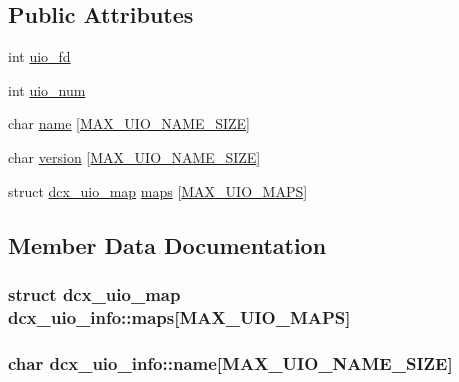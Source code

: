 \subsection*{Public Attributes}
\begin{DoxyCompactItemize}
\item 
int \hyperlink{structdcx__uio__info_a2ebe1bdd70d7c34232ea3f85c1d591d3}{uio\+\_\+fd}
\item 
int \hyperlink{structdcx__uio__info_a02e1b0caf53d192f1d50de34f63d55a0}{uio\+\_\+num}
\item 
char \hyperlink{structdcx__uio__info_ab4b1a749035222b5f3ef16038284595f}{name} \mbox{[}\hyperlink{uio_8h_a5ed3f1c67d5551770a91ef53fe208c83}{M\+A\+X\+\_\+\+U\+I\+O\+\_\+\+N\+A\+M\+E\+\_\+\+S\+I\+ZE}\mbox{]}
\item 
char \hyperlink{structdcx__uio__info_ae1be148e26467d078ca0383c16f76a41}{version} \mbox{[}\hyperlink{uio_8h_a5ed3f1c67d5551770a91ef53fe208c83}{M\+A\+X\+\_\+\+U\+I\+O\+\_\+\+N\+A\+M\+E\+\_\+\+S\+I\+ZE}\mbox{]}
\item 
struct \hyperlink{structdcx__uio__map}{dcx\+\_\+uio\+\_\+map} \hyperlink{structdcx__uio__info_ae6e32e304b1afe3b2dfeeb1a54321919}{maps} \mbox{[}\hyperlink{uio_8h_a05a77cb47b9d8cdaaee64df37627ffdc}{M\+A\+X\+\_\+\+U\+I\+O\+\_\+\+M\+A\+PS}\mbox{]}
\end{DoxyCompactItemize}


\subsection{Member Data Documentation}
\subsubsection[{\texorpdfstring{maps}{maps}}]{\setlength{\rightskip}{0pt plus 5cm}struct {\bf dcx\+\_\+uio\+\_\+map} dcx\+\_\+uio\+\_\+info\+::maps\mbox{[}{\bf M\+A\+X\+\_\+\+U\+I\+O\+\_\+\+M\+A\+PS}\mbox{]}}\hypertarget{structdcx__uio__info_ae6e32e304b1afe3b2dfeeb1a54321919}{}\label{structdcx__uio__info_ae6e32e304b1afe3b2dfeeb1a54321919}
\subsubsection[{\texorpdfstring{name}{name}}]{\setlength{\rightskip}{0pt plus 5cm}char dcx\+\_\+uio\+\_\+info\+::name\mbox{[}{\bf M\+A\+X\+\_\+\+U\+I\+O\+\_\+\+N\+A\+M\+E\+\_\+\+S\+I\+ZE}\mbox{]}}\hypertarget{structdcx__uio__info_ab4b1a749035222b5f3ef16038284595f}{}\label{structdcx__uio__info_ab4b1a749035222b5f3ef16038284595f}
